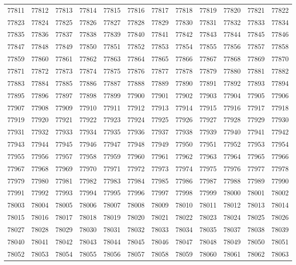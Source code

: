 \begin{center}
\begin{longtable}{llllllllllll}
77811 &77812 &77813 &77814 &77815 &77816 &77817 &77818 &77819 &77820 &77821 &77822 \\
77823 &77824 &77825 &77826 &77827 &77828 &77829 &77830 &77831 &77832 &77833 &77834 \\
77835 &77836 &77837 &77838 &77839 &77840 &77841 &77842 &77843 &77844 &77845 &77846 \\
77847 &77848 &77849 &77850 &77851 &77852 &77853 &77854 &77855 &77856 &77857 &77858 \\
77859 &77860 &77861 &77862 &77863 &77864 &77865 &77866 &77867 &77868 &77869 &77870 \\
77871 &77872 &77873 &77874 &77875 &77876 &77877 &77878 &77879 &77880 &77881 &77882 \\
77883 &77884 &77885 &77886 &77887 &77888 &77889 &77890 &77891 &77892 &77893 &77894 \\
77895 &77896 &77897 &77898 &77899 &77900 &77901 &77902 &77903 &77904 &77905 &77906 \\
77907 &77908 &77909 &77910 &77911 &77912 &77913 &77914 &77915 &77916 &77917 &77918 \\
77919 &77920 &77921 &77922 &77923 &77924 &77925 &77926 &77927 &77928 &77929 &77930 \\
77931 &77932 &77933 &77934 &77935 &77936 &77937 &77938 &77939 &77940 &77941 &77942 \\
77943 &77944 &77945 &77946 &77947 &77948 &77949 &77950 &77951 &77952 &77953 &77954 \\
77955 &77956 &77957 &77958 &77959 &77960 &77961 &77962 &77963 &77964 &77965 &77966 \\
77967 &77968 &77969 &77970 &77971 &77972 &77973 &77974 &77975 &77976 &77977 &77978 \\
77979 &77980 &77981 &77982 &77983 &77984 &77985 &77986 &77987 &77988 &77989 &77990 \\
77991 &77992 &77993 &77994 &77995 &77996 &77997 &77998 &77999 &78000 &78001 &78002 \\
78003 &78004 &78005 &78006 &78007 &78008 &78009 &78010 &78011 &78012 &78013 &78014 \\
78015 &78016 &78017 &78018 &78019 &78020 &78021 &78022 &78023 &78024 &78025 &78026 \\
78027 &78028 &78029 &78030 &78031 &78032 &78033 &78034 &78035 &78037 &78038 &78039 \\
78040 &78041 &78042 &78043 &78044 &78045 &78046 &78047 &78048 &78049 &78050 &78051 \\
78052 &78053 &78054 &78055 &78056 &78057 &78058 &78059 &78060 &78061 &78062 &78063 \\

\end{longtable}
\end{center}
